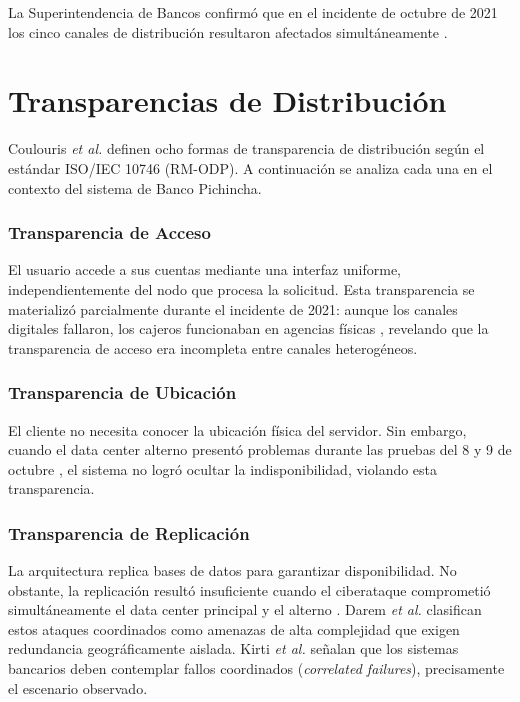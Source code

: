 \documentclass[12pt,a4paper]{article}
\begin{document}
La Superintendencia de Bancos confirm\'o que en el incidente de octubre de 2021 los cinco canales de distribuci\'on resultaron afectados simult\'aneamente \cite{SuperbancosCanales2021}.

\section{Transparencias de Distribuci\'on}

Coulouris \textit{et al.} \cite{Coulouris2011} definen ocho formas de transparencia de distribuci\'on seg\'un el est\'andar ISO/IEC 10746 (RM-ODP). A continuaci\'on se analiza cada una en el contexto del sistema de Banco Pichincha.

\subsubsection{Transparencia de Acceso}
El usuario accede a sus cuentas mediante una interfaz uniforme, independientemente del nodo que procesa la solicitud. Esta transparencia se materializ\'o parcialmente durante el incidente de 2021: aunque los canales digitales fallaron, los cajeros funcionaban en agencias f\'isicas \cite{ElUniverso2021}, revelando que la transparencia de acceso era incompleta entre canales heterog\'eneos.

\subsubsection{Transparencia de Ubicaci\'on}
El cliente no necesita conocer la ubicaci\'on f\'isica del servidor. Sin embargo, cuando el data center alterno present\'o problemas durante las pruebas del 8 y 9 de octubre \cite{SuperbancosIncidente2021}, el sistema no logr\'o ocultar la indisponibilidad, violando esta transparencia.

\subsubsection{Transparencia de Replicaci\'on}
La arquitectura replica bases de datos para garantizar disponibilidad. No obstante, la replicaci\'on result\'o insuficiente cuando el ciberataque comprometi\'o simult\'aneamente el data center principal y el alterno \cite{SuperbancosIncidente2021}. Darem \textit{et al.} \cite{DaremCyberThreats2023} clasifican estos ataques coordinados como amenazas de alta complejidad que exigen redundancia geogr\'aficamente aislada. Kirti \textit{et al.} \cite{KirtiFaultTolerance2024} se\~nalan que los sistemas bancarios deben contemplar fallos coordinados (\textit{correlated failures}), precisamente el escenario observado.
\end{document}
